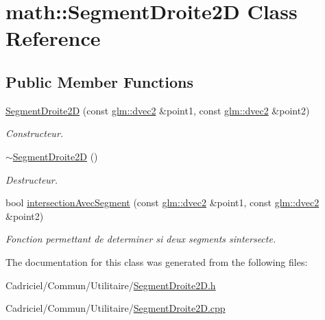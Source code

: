 \hypertarget{classmath_1_1_segment_droite2_d}{}\section{math\+:\+:Segment\+Droite2D Class Reference}
\label{classmath_1_1_segment_droite2_d}
\subsection*{Public Member Functions}
\begin{DoxyCompactItemize}
\item 
\hyperlink{group__inf2990_ga2c78660745180150591d3965fa7f42e7}{Segment\+Droite2D} (const \hyperlink{group__core__types_gae6727259898288cae197724d5f172b3b}{glm\+::dvec2} \&point1, const \hyperlink{group__core__types_gae6727259898288cae197724d5f172b3b}{glm\+::dvec2} \&point2)
\begin{DoxyCompactList}\small\item\em Constructeur. \end{DoxyCompactList}\item 
\hyperlink{group__inf2990_ga43a27782519b8fa8a65341f696c2386c}{$\sim$\+Segment\+Droite2D} ()
\begin{DoxyCompactList}\small\item\em Destructeur. \end{DoxyCompactList}\item 
bool \hyperlink{group__inf2990_gaba564de77b288f588aa6cd7bb28f7860}{intersection\+Avec\+Segment} (const \hyperlink{group__core__types_gae6727259898288cae197724d5f172b3b}{glm\+::dvec2} \&point1, const \hyperlink{group__core__types_gae6727259898288cae197724d5f172b3b}{glm\+::dvec2} \&point2)
\begin{DoxyCompactList}\small\item\em Fonction permettant de determiner si deux segments s\textquotesingle{}intersecte. \end{DoxyCompactList}\end{DoxyCompactItemize}


The documentation for this class was generated from the following files\+:\begin{DoxyCompactItemize}
\item 
Cadriciel/\+Commun/\+Utilitaire/\hyperlink{_segment_droite2_d_8h}{Segment\+Droite2\+D.\+h}\item 
Cadriciel/\+Commun/\+Utilitaire/\hyperlink{_segment_droite2_d_8cpp}{Segment\+Droite2\+D.\+cpp}\end{DoxyCompactItemize}
